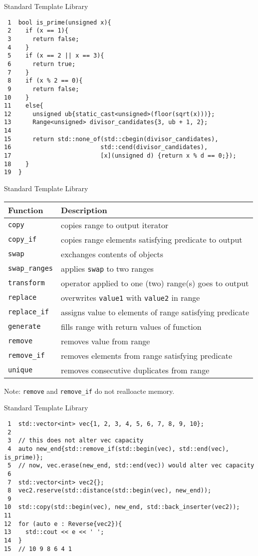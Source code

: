 \documentclass[presentation]{beamer}
\begin{document}
\begin{frame}[label={sec:org5c5e421},fragile]{Standard Template Library}
 \begin{verbatim}
 1  bool is_prime(unsigned x){
 2    if (x == 1){
 3      return false;
 4    }
 5    if (x == 2 || x == 3){
 6      return true;
 7    }
 8    if (x % 2 == 0){
 9      return false;
10    }
11    else{
12      unsigned ub{static_cast<unsigned>(floor(sqrt(x)))};
13      Range<unsigned> divisor_candidates{3, ub + 1, 2};
14  
15      return std::none_of(std::cbegin(divisor_candidates),
16                         std::cend(divisor_candidates),
17                         [x](unsigned d) {return x % d == 0;});
18    }
19  }
\end{verbatim}
\end{frame}
\begin{frame}[label={sec:org6be59cf},fragile]{Standard Template Library}
 \begin{center}
\begin{tabular}{ll}
Function & Description\\
\hline
\texttt{copy} & copies range to output iterator\\
\texttt{copy\_if} & copies range elements satisfying predicate to output\\
\texttt{swap} & exchanges contents of objects\\
\texttt{swap\_ranges} & applies \texttt{swap} to two ranges\\
\texttt{transform} & operator applied to one (two) range(s) goes to output\\
\texttt{replace} & overwrites \texttt{value1} with \texttt{value2} in range\\
\texttt{replace\_if} & assigns value to elements of range satisfying predicate\\
\texttt{generate} & fills range with return values of function\\
\texttt{remove} & removes value from range\\
\texttt{remove\_if} & removes elements from range satisfying predicate\\
\texttt{unique} & removes consecutive duplicates from range\\
\end{tabular}
\end{center}
Note: \texttt{remove} and \texttt{remove\_if} do not realloacte memory.
\end{frame}
\begin{frame}[label={sec:org31dd10d},fragile]{Standard Template Library}
 \begin{verbatim}
 1  std::vector<int> vec{1, 2, 3, 4, 5, 6, 7, 8, 9, 10};
 2  
 3  // this does not alter vec capacity
 4  auto new_end{std::remove_if(std::begin(vec), std::end(vec), is_prime)};
 5  // now, vec.erase(new_end, std::end(vec)) would alter vec capacity
 6  
 7  std::vector<int> vec2{};
 8  vec2.reserve(std::distance(std::begin(vec), new_end));
 9  
10  std::copy(std::begin(vec), new_end, std::back_inserter(vec2));
11  
12  for (auto e : Reverse{vec2}){
13    std::cout << e << ' ';
14  }
15  // 10 9 8 6 4 1 
\end{verbatim}
\end{frame}
\end{document}

